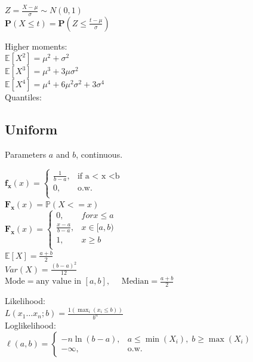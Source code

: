 $Z= \frac{X-\mu}{\sigma} \sim N(0,1)$\\

$\mathbf{P}\left(X\leq t\right) = \displaystyle \mathbf{P}\left(Z\leq \frac{t-\mu}{\sigma}\right)$

Higher moments:\\

$\mathbb{E}[X^2] = \mu^2 + \sigma^2$\\
$\mathbb{E}[X^3] = \mu^3 + 3\mu\sigma^2$\\
$\mathbb{E}[X^4] = \mu^4 + 6\mu^2\sigma^2 +3\sigma^4$\\

Quantiles:\\

\subsection*{Uniform}

Parameters $a$ and $b$, continuous.

$ \mathbf{f_x}(x)=
	\begin{cases}
		 \frac{1}{b-a},&\text{if a < x <b}\\
		0,&\text{o.w.}\\
	\end{cases}
$\\
$ \mathbf{F_x}(x)=\mathbb{P}(X<=x)
$\\
$ \mathbf{F_x}(x)=
	\begin{cases}
		 0,&for x \leq a\\
		 \frac{x-a}{b-a},& x \in [a,b)\\
		1,&x \geq b\\
	\end{cases}
$\\


$\mathbb{E}[X]=\frac{a+b}{2}$\\
$Var(X)=\frac{(b-a)^2}{12}$\\
$\text{Mode} = \text{any value in } [a,b],\quad$ 
$\text{Median} = \frac{a+b}{2}$


Likelihood:\\
$L(x_1\dots x_n;b)=\frac{1(\max_i (x_i \leq b))} {b^n}$\\

Loglikelihood:\\
$\ell(a,b)=
	\begin{cases}
		-n \ln(b - a), & a \le \min(X_i), \; b \ge \max(X_i)\\
		-\infty, & \text{o.w.}
	\end{cases}
$\\[6pt]

